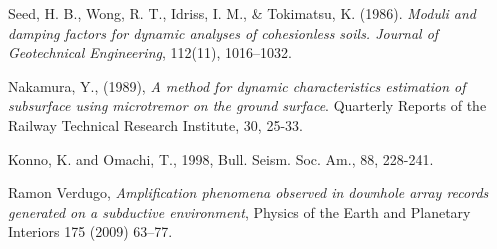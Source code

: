 \documentclass[letterpaper,11pt]{article} %
\begin{document}












\newpage
\begin{references}
	 Seed, H. B., Wong, R. T., Idriss, I. M., \& Tokimatsu, K. (1986). \textit{Moduli and damping factors for dynamic analyses of cohesionless soils. Journal of Geotechnical Engineering}, 112(11), 1016–1032.
	
	 Nakamura, Y., (1989), \textit{A method for dynamic characteristics estimation of subsurface using microtremor on the ground surface}. Quarterly Reports of the Railway Technical Research Institute, 30, 25-33.
	
	 Konno, K. and Omachi, T., 1998, Bull. Seism. Soc. Am., 88, 228-241.
	
	
	 Ramon Verdugo, \textit{Amplification phenomena observed in downhole array records generated on a subductive environment}, Physics of the Earth and Planetary Interiors 175 (2009) 63–77.
\end{references}

\end{document}
